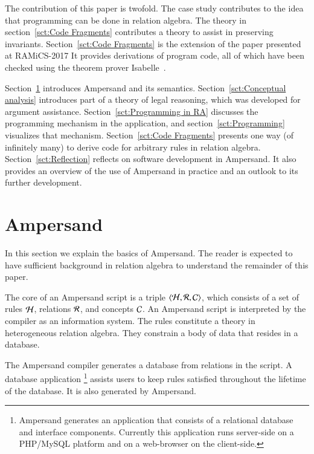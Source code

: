 \documentclass{elsarticle}
\begin{document}
	The contribution of this paper is twofold.
	The case study contributes to the idea that programming can be done in relation algebra.
	The theory in section~\ref{sct:Code Fragments} contributes a theory to assist in preserving invariants.
	Section~\ref{sct:Code Fragments} is the extension of the paper presented at RAMiCS-2017 \cite{JoostenRAMiCS2017}
	It provides derivations of program code,
	all of which have been checked using the theorem prover Isabelle~\cite{Nipkow2002}.

	Section~\ref{sct:Ampersand} introduces Ampersand and its semantics.
	Section~\ref{sct:Conceptual analysis} introduces part of a theory of legal reasoning,
	which was developed for argument assistance.
	Section~\ref{sct:Programming in RA} discusses the programming mechanism in the application,
	and section~\ref{sct:Programming} visualizes that mechanism.
	Section~\ref{sct:Code Fragments} presents one way (of infinitely many) to derive code for arbitrary rules in relation algebra.
	Section~\ref{sct:Reflection} reflects on software development in Ampersand.
	It also provides an overview of the use of Ampersand in practice and an outlook to its further development.

\section{Ampersand}
\label{sct:Ampersand}
	In this section we explain the basics of Ampersand.
	The reader is expected to have sufficient background in relation algebra to understand the remainder of this paper.

	The core of an Ampersand script is a triple $\langle\mathcal{H},\mathcal{R},\mathcal{C}\rangle$,
	which consists of a set of rules $\mathcal{H}$, relations $\mathcal{R}$, and concepts $\mathcal{C}$.
	An Ampersand script is interpreted by the compiler as an information system.
	The rules constitute a theory in heterogeneous relation algebra.
	They constrain a body of data that resides in a database.

	The Ampersand compiler generates a database from relations in the script.
	A database application%
\footnote{Ampersand generates an application that consists of a relational database and interface components.
	Currently this application runs server-side on a PHP/MySQL platform and on a web-browser on the client-side.}
	assists users to keep rules satisfied throughout the lifetime of the database. It is also generated by Ampersand.
\end{document}
